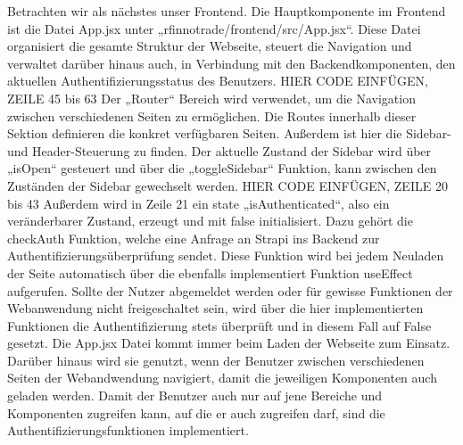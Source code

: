 Betrachten wir als nächstes unser Frontend. Die Hauptkomponente im Frontend ist die Datei App.jsx unter „rfinnotrade/frontend/src/App.jsx“. Diese Datei organisiert die gesamte Struktur der Webseite, steuert die Navigation und verwaltet darüber hinaus auch, in Verbindung mit den Backendkomponenten, den aktuellen Authentifizierungsstatus des Benutzers.
HIER CODE EINFÜGEN, ZEILE 45 bis 63
Der „Router“ Bereich wird verwendet, um die Navigation zwischen verschiedenen Seiten zu ermöglichen. Die Routes innerhalb dieser Sektion definieren die konkret verfügbaren Seiten.
Außerdem ist hier die Sidebar- und Header-Steuerung zu finden. Der aktuelle Zustand der Sidebar wird über „isOpen“ gesteuert und über die „toggleSidebar“ Funktion, kann zwischen den Zuständen der Sidebar gewechselt werden.
HIER CODE EINFÜGEN, ZEILE 20 bis 43
Außerdem wird in Zeile 21 ein state „isAuthenticated“, also ein veränderbarer Zustand, erzeugt und mit false initialisiert. Dazu gehört die checkAuth Funktion, welche eine Anfrage an Strapi ins Backend zur Authentifizierungsüberprüfung sendet. Diese Funktion wird bei jedem Neuladen der Seite automatisch über die ebenfalls implementiert Funktion useEffect aufgerufen.
Sollte der Nutzer abgemeldet werden oder für gewisse Funktionen der Webanwendung nicht freigeschaltet sein, wird über die hier implementierten Funktionen die Authentifizierung stets überprüft und in diesem Fall auf False gesetzt.
Die App.jsx Datei kommt immer beim Laden der Webseite zum Einsatz. Darüber hinaus wird sie genutzt, wenn der Benutzer zwischen verschiedenen Seiten der Webandwendung navigiert, damit die jeweiligen Komponenten auch geladen werden. Damit der Benutzer auch nur auf jene Bereiche und Komponenten zugreifen kann, auf die er auch zugreifen darf, sind die Authentifizierungsfunktionen implementiert.